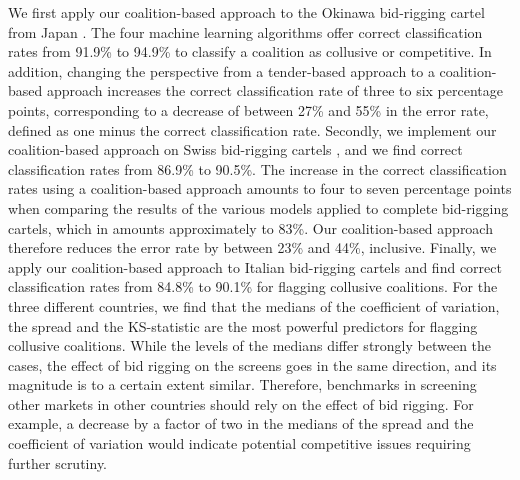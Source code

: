 \documentclass[a4paper,11pt]{article}
\begin{document}
	We first apply our coalition-based approach to the Okinawa bid-rigging cartel from Japan \citep[see also][]{ishii2014bid,huber2020transnational}. The four machine learning algorithms offer correct classification rates from 91.9\% to 94.9\% to classify a coalition as collusive or competitive. In addition, changing the perspective from a tender-based approach to a coalition-based approach increases the correct classification rate of three to six percentage points, corresponding to a decrease of between 27\% and 55\% in the error rate, defined as one minus the correct classification rate. Secondly, we implement our coalition-based approach on Swiss bid-rigging cartels \citep[see also][]{huber2019machine,wallimann2020machine}, and we find correct classification rates from 86.9\% to 90.5\%. The increase in the correct classification rates using a coalition-based approach amounts to four to seven percentage points when comparing the results of the various models applied to complete bid-rigging cartels, which in \cite{wallimann2020machine} amounts approximately to 83\%. Our coalition-based approach therefore reduces the error rate by between 23\% and 44\%, inclusive. Finally, we apply our coalition-based approach to Italian bid-rigging cartels \citep[see also][]{conley2016detecting} and find correct classification rates from 84.8\% to 90.1\% for flagging collusive coalitions. For the three different countries, we find that the medians of the coefficient of variation, the spread and the KS-statistic are the most powerful predictors for flagging collusive coalitions. While the levels of the medians differ strongly between the cases, the effect of bid rigging on the screens goes in the same direction, and its magnitude is to a certain extent similar. Therefore, benchmarks in screening other markets in other countries should rely on the effect of bid rigging. For example, a decrease by a factor of two in the medians of the spread and the coefficient of variation would indicate potential competitive issues requiring further scrutiny.
	
\end{document}
